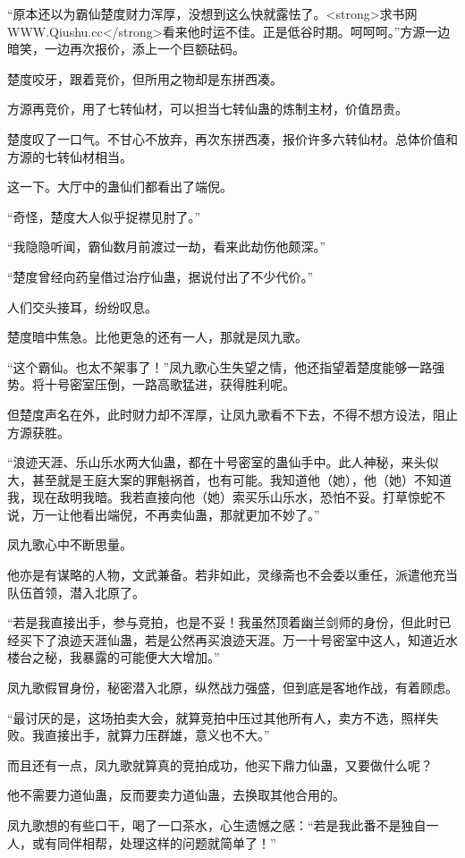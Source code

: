 \begin{this_body}
“原本还以为霸仙楚度财力浑厚，没想到这么快就露怯了。<strong>求书网WWW.Qiushu.cc</strong>看来他时运不佳。正是低谷时期。呵呵呵。”方源一边暗笑，一边再次报价，添上一个巨额砝码。

楚度咬牙，跟着竞价，但所用之物却是东拼西凑。

方源再竞价，用了七转仙材，可以担当七转仙蛊的炼制主材，价值昂贵。

楚度叹了一口气。不甘心不放弃，再次东拼西凑，报价许多六转仙材。总体价值和方源的七转仙材相当。

这一下。大厅中的蛊仙们都看出了端倪。

“奇怪，楚度大人似乎捉襟见肘了。”

“我隐隐听闻，霸仙数月前渡过一劫，看来此劫伤他颇深。”

“楚度曾经向药皇借过治疗仙蛊，据说付出了不少代价。”

人们交头接耳，纷纷叹息。

楚度暗中焦急。比他更急的还有一人，那就是凤九歌。

“这个霸仙。也太不架事了！”凤九歌心生失望之情，他还指望着楚度能够一路强势。将十号密室压倒，一路高歌猛进，获得胜利呢。

但楚度声名在外，此时财力却不浑厚，让凤九歌看不下去，不得不想方设法，阻止方源获胜。

“浪迹天涯、乐山乐水两大仙蛊，都在十号密室的蛊仙手中。此人神秘，来头似大，甚至就是王庭大案的罪魁祸首，也有可能。我知道他（她），他（她）不知道我，现在敌明我暗。我若直接向他（她）索买乐山乐水，恐怕不妥。打草惊蛇不说，万一让他看出端倪，不再卖仙蛊，那就更加不妙了。”

凤九歌心中不断思量。

他亦是有谋略的人物，文武兼备。若非如此，灵缘斋也不会委以重任，派遣他充当队伍首领，潜入北原了。

“若是我直接出手，参与竞拍，也是不妥！我虽然顶着幽兰剑师的身份，但此时已经买下了浪迹天涯仙蛊，若是公然再买浪迹天涯。万一十号密室中这人，知道近水楼台之秘，我暴露的可能便大大增加。”

凤九歌假冒身份，秘密潜入北原，纵然战力强盛，但到底是客地作战，有着顾虑。

“最讨厌的是，这场拍卖大会，就算竞拍中压过其他所有人，卖方不选，照样失败。我直接出手，就算力压群雄，意义也不大。”

而且还有一点，凤九歌就算真的竞拍成功，他买下鼎力仙蛊，又要做什么呢？

他不需要力道仙蛊，反而要卖力道仙蛊，去换取其他合用的。

凤九歌想的有些口干，喝了一口茶水，心生遗憾之感：“若是我此番不是独自一人，或有同伴相帮，处理这样的问题就简单了！”


\end{this_body}
